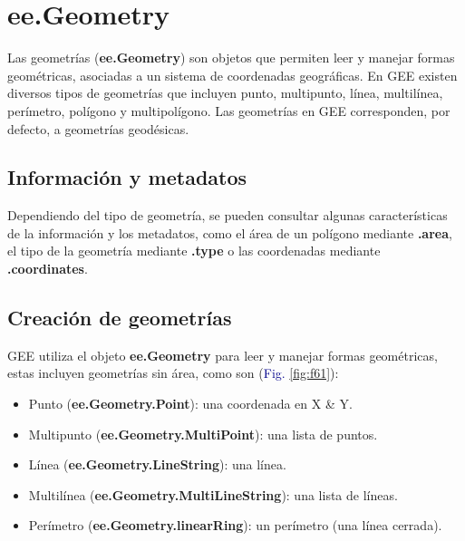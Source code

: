 \documentclass[
  12pt,
  letterpaper,
  twoside]{book}
\providecommand{\tightlist}{%
  \setlength{\itemsep}{0pt}\setlength{\parskip}{0pt}}
\newcommand\boldpurple[1]{\textcolor{darkpurple}{\textbf{#1}}}
\begin{document}
\newpage

\hypertarget{ee.geometry-1}{%
\chapter{ee.Geometry}\label{ee.geometry-1}}

Las geometrías (\boldpurple{ee.Geometry}) son objetos que permiten leer y manejar formas geométricas, asociadas a un sistema de coordenadas geográficas. En GEE existen diversos tipos de geometrías que incluyen punto, multipunto, línea, multilínea, perímetro, polígono y multipolígono. Las geometrías en GEE corresponden, por defecto, a geometrías geodésicas.

\hypertarget{informaciuxf3n-y-metadatos}{%
\section{Información y metadatos}\label{informaciuxf3n-y-metadatos}}

Dependiendo del tipo de geometría, se pueden consultar algunas características de la información y los metadatos, como el área de un polígono mediante \boldpurple{.area}, el tipo de la geometría mediante \boldpurple{.type} o las coordenadas mediante \boldpurple{.coordinates}.

\hypertarget{creaciuxf3n-de-geometruxedas}{%
\section{Creación de geometrías}\label{creaciuxf3n-de-geometruxedas}}

GEE utiliza el objeto \boldpurple{ee.Geometry} para leer y manejar formas geométricas, estas incluyen geometrías sin área, como son (\textcolor{darkblue}{Fig.} \ref{fig:f61}):

\begin{itemize}
\tightlist
\item
  Punto (\boldpurple{ee.Geometry.Point}): una coordenada en X \& Y.
\item
  Multipunto (\boldpurple{ee.Geometry.MultiPoint}): una lista de puntos.
\item
  Línea (\boldpurple{ee.Geometry.LineString}): una línea.
\item
  Multilínea (\boldpurple{ee.Geometry.MultiLineString}): una lista de líneas.
\item
  Perímetro (\boldpurple{ee.Geometry.linearRing}): un perímetro (una línea cerrada).
\end{itemize}
\end{document}
